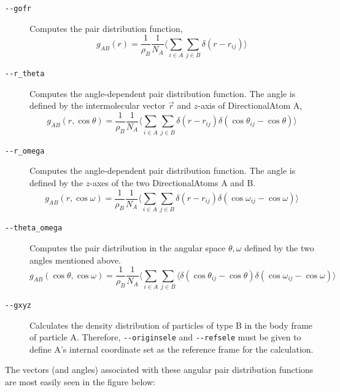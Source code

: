 \documentclass[]{book}
\begin{document}
\begin{description}
\item[{\tt -{}-gofr}] Computes the pair distribution function,
\begin{equation*}
g_{AB}(r) = \frac{1}{\rho_B}\frac{1}{N_A} \langle \sum_{i \in A}
\sum_{j \in B} \delta(r - r_{ij}) \rangle
\end{equation*}
\item[{\tt -{}-r\_theta}] Computes the angle-dependent pair distribution
function. The angle is defined by the intermolecular vector $\vec{r}$ and
$z$-axis of DirectionalAtom A,
\begin{equation*}
g_{AB}(r, \cos \theta) = \frac{1}{\rho_B}\frac{1}{N_A} \langle \sum_{i \in A}
\sum_{j \in B} \delta(r - r_{ij}) \delta(\cos \theta_{ij} - \cos \theta)\rangle
\end{equation*}
\item[{\tt -{}-r\_omega}] Computes the angle-dependent pair distribution
function. The angle is defined by the $z$-axes of the two
DirectionalAtoms A and B. 
\begin{equation*}
g_{AB}(r, \cos \omega) = \frac{1}{\rho_B}\frac{1}{N_A} \langle \sum_{i \in A}
\sum_{j \in B} \delta(r - r_{ij}) \delta(\cos \omega_{ij} - \cos \omega)\rangle
\end{equation*}
\item[{\tt -{}-theta\_omega}] Computes the pair distribution in the angular
space $\theta, \omega$ defined by the two angles mentioned above.
\begin{equation*}
g_{AB}(\cos\theta, \cos \omega) = \frac{1}{\rho_B}\frac{1}{N_A} \langle \sum_{i \in A}
\sum_{j \in B} \langle \delta(\cos \theta_{ij} - \cos \theta)
\delta(\cos \omega_{ij} - \cos \omega)\rangle
\end{equation*}
\item[{\tt -{}-gxyz}] Calculates the density distribution of particles of type
B in the body frame of particle A. Therefore, {\tt -{}-originsele} and
{\tt -{}-refsele} must be given to define A's internal coordinate set as
the reference frame for the calculation.
\end{description}

The vectors (and angles) associated with these angular pair
distribution functions are most easily seen in the figure below:
\end{document}
